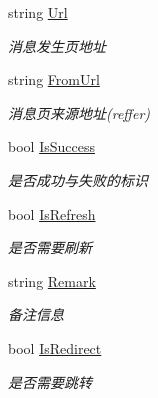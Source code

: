\begin{DoxyCompactItemize}
string \hyperlink{class_x_c_l_net_tools_1_1_message_1_1_message_model_a50c6a9523a8b8dc168360318f7be8574}{Url}
\begin{DoxyCompactList}\small\item\em 消息发生页地址 \end{DoxyCompactList}\item 
string \hyperlink{class_x_c_l_net_tools_1_1_message_1_1_message_model_afa48da00ef35d78d182c025a1f0dcbc0}{From\-Url}
\begin{DoxyCompactList}\small\item\em 消息页来源地址(reffer) \end{DoxyCompactList}\item 
bool \hyperlink{class_x_c_l_net_tools_1_1_message_1_1_message_model_a05485b542b8ef7f795ed5618fb80da03}{Is\-Success}
\begin{DoxyCompactList}\small\item\em 是否成功与失败的标识 \end{DoxyCompactList}\item 
bool \hyperlink{class_x_c_l_net_tools_1_1_message_1_1_message_model_a9bdd2a6fd62936962fe1a06233809f02}{Is\-Refresh}
\begin{DoxyCompactList}\small\item\em 是否需要刷新 \end{DoxyCompactList}\item 
string \hyperlink{class_x_c_l_net_tools_1_1_message_1_1_message_model_a9cbdcd7db26f62ea746c835e82e3dcf0}{Remark}
\begin{DoxyCompactList}\small\item\em 备注信息 \end{DoxyCompactList}\item 
bool \hyperlink{class_x_c_l_net_tools_1_1_message_1_1_message_model_a167c5dfe1818b0685dc7ceca3c1ed5ba}{Is\-Redirect}
\begin{DoxyCompactList}\small\item\em 是否需要跳转 \end{DoxyCompactList}\item 

\end{DoxyCompactItemize}
